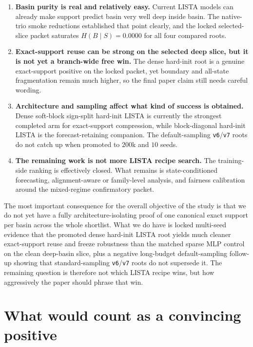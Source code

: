 \documentclass[11pt]{article}
\begin{document}
\begin{enumerate}[leftmargin=1.5em]
    \item \textbf{Basin purity is real and relatively easy.} Current LISTA
    models can already make support predict basin very well deep inside basin.
    The native-trio smoke reductions established that point clearly, and the
    locked selected-slice packet saturates $H(B \mid S)=0.0000$ for all four
    compared roots.
    \item \textbf{Exact-support reuse can be strong on the selected deep slice,
    but it is not yet a branch-wide free win.} The dense hard-init root is a
    genuine exact-support positive on the locked packet, yet boundary and
    all-state fragmentation remain much higher, so the final paper claim still
    needs careful wording.
    \item \textbf{Architecture and sampling affect what kind of success is
    obtained.} Dense soft-block sign-split hard-init LISTA is currently the
    strongest completed arm for exact-support compression, while block-diagonal
    hard-init LISTA is the forecast-retaining companion. The default-sampling
    \texttt{v6}/\texttt{v7} roots do not catch up when promoted to $200$k and
    $10$ seeds.
    \item \textbf{The remaining work is not more LISTA recipe search.} The
    training-side ranking is effectively closed. What remains is
    state-conditioned forecasting, alignment-aware or family-level analysis,
    and fairness calibration around the mixed-regime confirmatory packet.
\end{enumerate}

The most important consequence for the overall objective of the study is that
we do not yet have a fully architecture-isolating proof of one canonical exact
support per basin across the whole shortlist. What we do have is locked
multi-seed evidence that the promoted dense hard-init LISTA root yields much
cleaner exact-support reuse and freeze robustness than the matched sparse MLP
control on the clean deep-basin slice, plus a negative long-budget
default-sampling follow-up showing that standard-sampling \texttt{v6}/\texttt{v7}
roots do not supersede it. The remaining question is therefore not which LISTA
recipe wins, but how aggressively the paper should phrase that win.

\section{What would count as a convincing positive}
\end{document}
